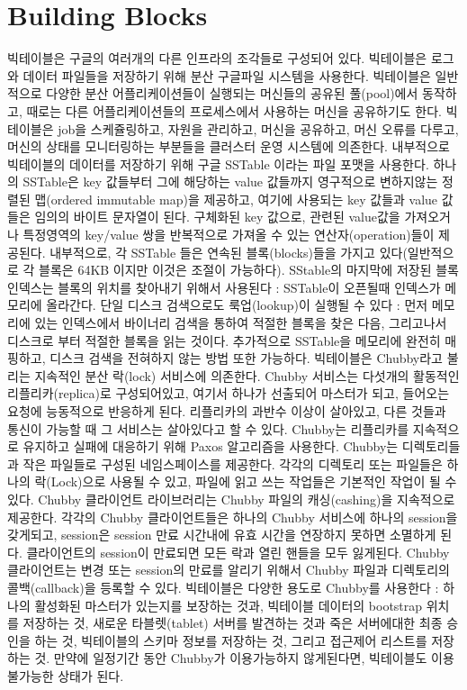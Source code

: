 \documentclass[twocolumn]{article}
\begin{document}
\section{Building Blocks}
빅테이블은 구글의 여러개의 다른 인프라의 조각들로 구성되어 있다. 빅테이블은 로그와 데이터 파일들을 저장하기 위해 분산 구글파일 시스템을 사용한다. 빅테이블은 일반적으로 다양한 분산 어플리케이션들이 실행되는 머신들의 공유된 풀(pool)에서 동작하고, 때로는 다른 어플리케이션들의 프로세스에서 사용하는 머신을 공유하기도 한다. 빅테이블은 job을 스케쥴링하고, 자원을 관리하고, 머신을 공유하고, 머신 오류를 다루고, 머신의 상태를 모니터링하는 부분들을 클러스터 운영 시스템에 의존한다.
 내부적으로 빅테이블의 데이터를 저장하기 위해 구글 SSTable 이라는 파일 포맷을 사용한다. 하나의 SSTable은 key 값들부터 그에 해당하는 value 값들까지 영구적으로 변하지않는 정렬된 맵(ordered immutable map)을 제공하고, 여기에 사용되는 key 값들과 value 값들은 임의의 바이트 문자열이 된다. 구체화된 key 값으로, 관련된 value값을 가져오거나 특정영역의 key/value 쌍을 반복적으로 가져올 수 있는 연산자(operation)들이 제공된다. 내부적으로, 각 SSTable 들은 연속된 블록(blocks)들을 가지고 있다(일반적으로 각 블록은 64KB 이지만 이것은 조절이 가능하다). SStable의 마지막에 저장된 블록 인덱스는 블록의 위치를 찾아내기 위해서 사용된다 : SSTable이 오픈될때 인덱스가 메모리에 올라간다.
단일 디스크 검색으로도 룩업(lookup)이 실행될 수 있다 : 먼저 메모리에 있는 인덱스에서 바이너리 검색을 통하여 적절한 블록을 찾은 다음, 그리고나서 디스크로 부터 적절한 블록을 읽는 것이다. 추가적으로 SSTable을 메모리에 완전히 매핑하고, 디스크 검색을 전혀하지 않는 방법 또한 가능하다.
빅테이블은 Chubby라고 불리는 지속적인 분산 락(lock) 서비스에 의존한다. Chubby 서비스는 다섯개의 활동적인 리플리카(replica)로 구성되어있고, 여기서 하나가 선출되어 마스터가 되고, 들어오는 요청에 능동적으로 반응하게 된다. 리플리카의 과반수 이상이 살아있고, 다른 것들과 통신이 가능할 때 그 서비스는 살아있다고 할 수 있다. Chubby는 리플리카를 지속적으로 유지하고 실패에 대응하기 위해 Paxos 알고리즘을 사용한다. Chubby는 디렉토리들과 작은 파일들로 구성된 네임스페이스를 제공한다. 각각의 디렉토리 또는 파일들은 하나의 락(Lock)으로 사용될 수 있고, 파일에 읽고 쓰는 작업들은 기본적인 작업이 될 수 있다. Chubby 클라이언트 라이브러리는 Chubby 파일의 캐싱(cashing)을 지속적으로 제공한다. 각각의 Chubby 클라이언트들은 하나의 Chubby 서비스에 하나의 session을 갖게되고, session은 session 만료 시간내에 유효 시간을 연장하지 못하면 소멸하게 된다. 클라이언트의 session이 만료되면 모든 락과 열린 핸들을 모두 잃게된다. Chubby 클라이언트는 변경 또는 session의 만료를 알리기 위해서 Chubby 파일과 디렉토리의 콜백(callback)을 등록할 수 있다.
빅테이블은 다양한 용도로 Chubby를 사용한다 : 하나의 활성화된 마스터가 있는지를 보장하는 것과, 빅테이블 데이터의 bootstrap 위치를 저장하는 것, 새로운 타블렛(tablet) 서버를 발견하는 것과 죽은 서버에대한 최종 승인을 하는 것, 빅테이블의 스키마 정보를 저장하는 것, 그리고 접근제어 리스트를 저장하는 것. 만약에 일정기간 동안 Chubby가 이용가능하지 않게된다면, 빅테이블도 이용불가능한 상태가 된다.
 
\end{document}
